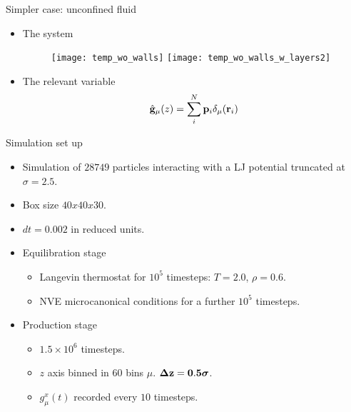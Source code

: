 \documentclass{beamer}
\begin{document}
\begin{frame}{Simpler case: unconfined fluid}
  \begin{center}
  \begin{itemize}
  \item The system
  \begin{figure}
    \texttt{[image: temp\_wo\_walls]}
    \texttt{[image: temp\_wo\_walls\_w\_layers2]}
\end{figure}
\item The relevant variable
\begin{align}
  \hat{\bf g}_\mu(z)= \sum_i^N{\bf p}_i\delta_\mu({\bf r}_i)
\nonumber
\end{align}
\end{itemize}
  \end{center}
\end{frame}

 \begin{frame}{Simulation set up}
   \begin{itemize}
     \item Simulation of $28749$ particles interacting with a LJ potential truncated at $\sigma=2.5$.
     \item Box size $40x40x30$.
     \item $dt=0.002$ in reduced units.
     \item Equilibration stage
       \begin{itemize}
         \item Langevin thermostat for $10^5$ timesteps: $T=2.0$, $\rho=0.6$.
         \item NVE microcanonical conditions for a further $10^5$ timesteps.
          \end{itemize}
        \item Production stage
       \begin{itemize}
         \item $1.5\times10^6$ timesteps.
         \item $z$ axis binned in $60$ bins $\mu$. {$\boldsymbol{\Delta} {\bf z=0.5}\boldsymbol{\sigma}$}.
         \item $g_{\mu}^x(t)$ recorded every $10$ timesteps.
         \end{itemize}
     \end{itemize}
 \end{frame}
\end{document}
